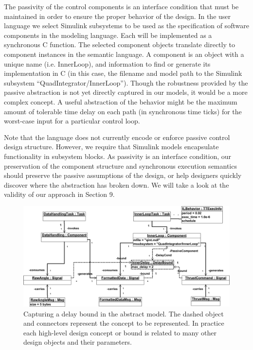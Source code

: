 The passivity of the control components is an interface condition that must be
maintained in order to ensure the proper behavior of the design.  In the user
language we select Simulink subsystems to be used as the specification of
software components in the modeling language.  Each will be implemented as a
synchronous C function.  The selected component objects translate directly to
component instances in the semantic language.  A component is an object with a
unique name (i.e. InnerLoop), and information to find or generate its
implementation in C (in this case, the filename and model path to the Simulink
subsystem "`QuadIntegrator/InnerLoop"'). Though the robustness provided by the
passive abstraction is not yet directly captured in our models, it would be a
more complex concept.  A useful abstraction of the behavior might be the maximum
amount of tolerable time delay on each path (in synchronous time ticks) for the
worst-case input for a particular control loop.  

Note that the language does not currently encode or enforce passive control design 
structure.  However, we require that Simulink models encapsulate functionality 
in subsystem blocks. As passivity is an interface condition, our preservation of
the component structure and synchronous execution semantics should preserve the
passive assumptions of the design, or help designers quickly discover where the
abstraction has broken down.  We will take a look at the validity of our approach 
in Section 9.

\begin{figure}
\centering
\includegraphics[width=\columnwidth]{figures/delay_bound.png}
    \caption{Capturing a delay bound in the abstract model.  The dashed object
and connectors represent the concept to be represented.  In practice each
high-level design concept or bound is related to many other design objects and
their parameters.}
    \label{fig:delay_abs}
\end{figure}


